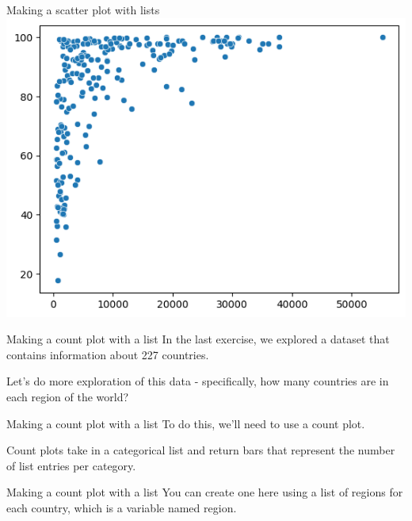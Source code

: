 \documentclass[
  ignorenonframetext,
]{beamer}
\begin{document}
\begin{frame}{Making a scatter plot with lists}
\label{making-a-scatter-plot-with-lists-9}
\includegraphics{../images/im254.png}
\end{frame}

\begin{frame}{Making a count plot with a list}
\label{making-a-count-plot-with-a-list}
In the last exercise, we explored a dataset that contains information
about 227 countries.

Let's do more exploration of this data - specifically, how many
countries are in each region of the world?
\end{frame}

\begin{frame}{Making a count plot with a list}
\label{making-a-count-plot-with-a-list-1}
To do this, we'll need to use a count plot.

Count plots take in a categorical list and return bars that represent
the number of list entries per category.
\end{frame}

\begin{frame}{Making a count plot with a list}
\label{making-a-count-plot-with-a-list-2}
You can create one here using a list of regions for each country, which
is a variable named region.
\end{frame}
\end{document}
